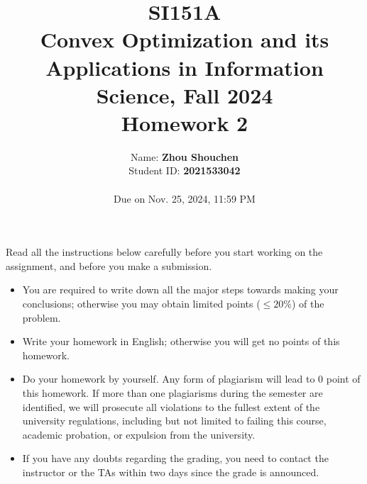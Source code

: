 \documentclass[10pt]{article}
\begin{document}
\date{
Name: \textbf{Zhou Shouchen} \\ Student ID: \textbf{2021533042} \\ \ \\
Due on Nov. 25, 2024, 11:59 PM}
\title{SI151A \\ Convex Optimization and its Applications in Information Science, Fall 2024 \\
Homework 2 \\}
\maketitle
Read all the instructions below carefully before you start working on the assignment, and before you make a submission.
\begin{itemize}
\item You are required to write down all the major steps towards making your conclusions; otherwise you may obtain limited points ($\leq 20\%$) of the problem.
\item Write your homework in English; otherwise you will get no points of this homework.
\item Do your homework by yourself. Any form of plagiarism will lead to $0$ point of this homework. If more than one plagiarisms during the semester are identified, we will prosecute all violations to the fullest extent of the university regulations, including but not limited to failing this course, academic probation, or expulsion from the university.
\item If you have any doubts regarding the grading, you need to contact the instructor or the TAs within two days since the grade is announced.
\end{itemize}
\newpage

\begin{itemize}







\end{itemize}
\end{document}
